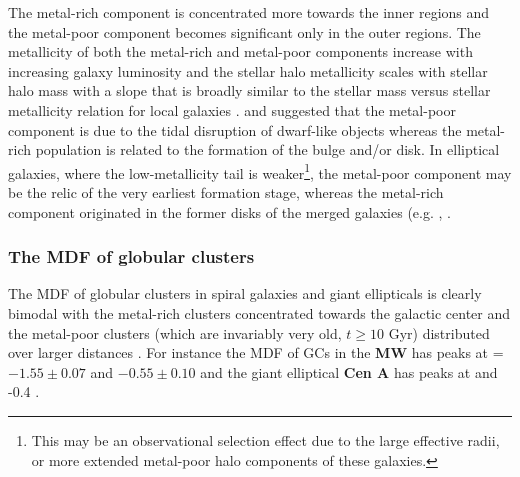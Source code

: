 \documentclass{aa}
\begin{document}
The metal-rich component is concentrated more towards the inner regions
and the metal-poor component becomes significant only in the outer regions. 
The metallicity of both the metal-rich and metal-poor 
components increase with increasing galaxy luminosity \citep{mouhcine06} and the stellar halo metallicity scales with  
stellar halo mass \citep{harmsen17} with a slope that is broadly similar to the stellar mass versus stellar metallicity relation for local galaxies \citep{gallazzi05, kirby13}.  \citet{forbes97} and \citet{mouhcine06} suggested that the metal-poor 
component is due to the tidal disruption of dwarf-like objects whereas the metal-rich 
population is related to the formation of the bulge and/or disk. In elliptical galaxies, where the low-metallicity tail is weaker\footnote{This may be an observational selection effect due to the
large effective radii, or more extended metal-poor halo components of these galaxies.}, the metal-poor component may 
be the relic of the very earliest formation stage, whereas the metal-rich component originated in the former disks of the merged galaxies (e.g. \citet{harris07a}, \citet{bekki02}.



\subsubsection{The MDF of globular clusters} \label{sec:2.1.2}


The MDF of globular clusters in spiral galaxies and giant ellipticals is clearly bimodal
with the metal-rich clusters concentrated towards the galactic center and the metal-poor clusters
(which are invariably very old, $t \ge 10$ Gyr) 
distributed over larger distances \citep{gebhardt99,peng06,brodie12}. 
  For instance the MDF of GCs in the {\bf MW} has peaks at   
\FeH =$-1.55 \pm 0.07$ and $-0.55 \pm 0.10$ \citep{harris16} 
and the giant elliptical {\bf Cen A} has peaks at  and -0.4 \citep{beasley08}.
\end{document}
